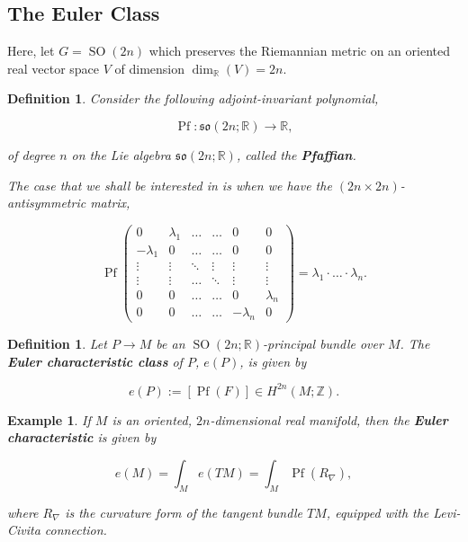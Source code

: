 \documentclass{article}
\newtheorem{defn}[theorem]{Definition\rm}
\newtheorem{example}{Example}
\newcommand{\ra}{\rightarrow}
\newcommand{\lra}{\longrightarrow}
\newcommand{\RR}{\mathbb{R}}
\newcommand{\ZZ}{\mathbb{Z}}
\newcommand{\mf}[1]{\mathfrak{#1}}
\DeclareMathOperator{\Pf}{Pf}
\DeclareMathOperator{\SO}{SO}
\begin{document}
\subsection{The Euler Class}

Here, let $G = \SO(2n)$ which preserves the Riemannian metric on an oriented real vector space $V$ of dimension $\dim_{\RR}(V) = 2n$.

\begin{defn}
	Consider the following adjoint-invariant polynomial,
	
	\begin{equation*}
		\Pf : \mf{so}(2n;\RR) \lra \RR,
	\end{equation*}

	of degree $n$ on the Lie algebra $\mf{so}(2n;\RR)$, called the \textbf{Pfaffian}.
	
	The case that we shall be interested in is when we have the $(2n \times 2n)$-antisymmetric matrix,
	
	\begin{equation*}
		\Pf
		\begin{pmatrix}
			0 & \lambda_{1} & \dots & \dots & 0 & 0 \\
			-\lambda_{1} & 0 & \dots & \dots & 0 & 0 \\
			\vdots & \vdots & \ddots & \vdots & \vdots & \vdots \\
			\vdots & \vdots & \dots & \ddots & \vdots & \vdots \\
			0 & 0 & \dots & \dots & 0 & \lambda_{n} \\
			0 & 0 & \dots & \dots & -\lambda_{n} & 0			
		\end{pmatrix}
		= \lambda_{1}\cdot\ldots \cdot \lambda_{n}.
	\end{equation*}
	
\end{defn}

\begin{defn}
	
	Let $P \ra M$ be an $\SO(2n;\RR)$-principal bundle over $M$. The \textbf{Euler characteristic class} of $P$, $e(P)$, is given by
	
	\begin{equation*}
		e(P) := [\Pf(F)] \in H^{2n}(M; \ZZ).
	\end{equation*}

\end{defn}

\begin{example}
	If $M$ is an oriented, $2n$-dimensional real manifold, then the \textbf{Euler characteristic} is given by

	\begin{equation*}
		e(M) = \int_{M} e(TM) = \int_{M} \Pf(R_{\nabla}),
	\end{equation*}

	where $R_{\nabla}$ is the curvature form of the tangent bundle $TM$, equipped with the Levi-Civita connection.
\end{example}
\end{document}
